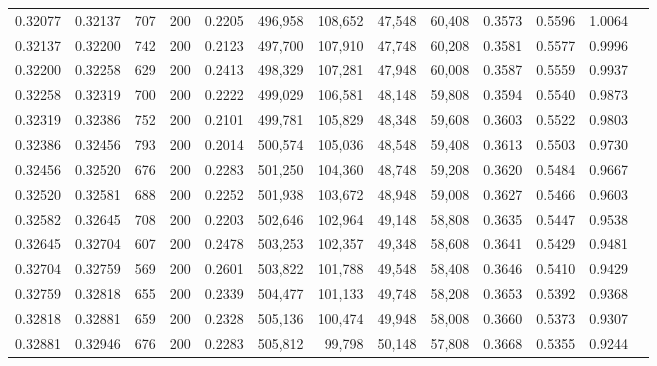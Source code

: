 \begin{tabular}{rrrrrrrrrrrrr}
0.32077 & 0.32137 &    707 & 200 &                                     0.2205 & 496,958 & 108,652 &  47,548 &  60,408 & 0.3573 & 0.5596 & 1.0064 \\
0.32137 & 0.32200 &    742 & 200 &                                     0.2123 & 497,700 & 107,910 &  47,748 &  60,208 & 0.3581 & 0.5577 & 0.9996 \\
0.32200 & 0.32258 &    629 & 200 &                                     0.2413 & 498,329 & 107,281 &  47,948 &  60,008 & 0.3587 & 0.5559 & 0.9937 \\
0.32258 & 0.32319 &    700 & 200 &                                     0.2222 & 499,029 & 106,581 &  48,148 &  59,808 & 0.3594 & 0.5540 & 0.9873 \\
0.32319 & 0.32386 &    752 & 200 &                                     0.2101 & 499,781 & 105,829 &  48,348 &  59,608 & 0.3603 & 0.5522 & 0.9803 \\
0.32386 & 0.32456 &    793 & 200 &                                     0.2014 & 500,574 & 105,036 &  48,548 &  59,408 & 0.3613 & 0.5503 & 0.9730 \\
0.32456 & 0.32520 &    676 & 200 &                                     0.2283 & 501,250 & 104,360 &  48,748 &  59,208 & 0.3620 & 0.5484 & 0.9667 \\
0.32520 & 0.32581 &    688 & 200 &                                     0.2252 & 501,938 & 103,672 &  48,948 &  59,008 & 0.3627 & 0.5466 & 0.9603 \\
0.32582 & 0.32645 &    708 & 200 &                                     0.2203 & 502,646 & 102,964 &  49,148 &  58,808 & 0.3635 & 0.5447 & 0.9538 \\
0.32645 & 0.32704 &    607 & 200 &                                     0.2478 & 503,253 & 102,357 &  49,348 &  58,608 & 0.3641 & 0.5429 & 0.9481 \\
0.32704 & 0.32759 &    569 & 200 &                                     0.2601 & 503,822 & 101,788 &  49,548 &  58,408 & 0.3646 & 0.5410 & 0.9429 \\
0.32759 & 0.32818 &    655 & 200 &                                     0.2339 & 504,477 & 101,133 &  49,748 &  58,208 & 0.3653 & 0.5392 & 0.9368 \\
0.32818 & 0.32881 &    659 & 200 &                                     0.2328 & 505,136 & 100,474 &  49,948 &  58,008 & 0.3660 & 0.5373 & 0.9307 \\
0.32881 & 0.32946 &    676 & 200 &                                     0.2283 & 505,812 &  99,798 &  50,148 &  57,808 & 0.3668 & 0.5355 & 0.9244 \\

\end{tabular}
